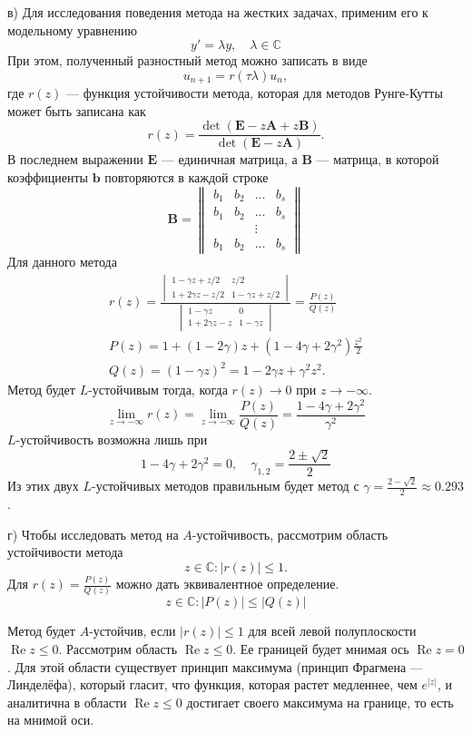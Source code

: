 \documentclass[12pt]{article}
\renewcommand{\vec}[1]{\boldsymbol{\mathbf{#1}}}
\begin{document}
в) Для исследования поведения метода на жестких задачах, применим его к модельному уравнению 
\[
y' = \lambda y,\quad\lambda \in \mathbb{C}
\]
При этом, полученный разностный метод можно записать в виде
\[
u_{n+1} = r(\tau \lambda) u_n,
\]
где $r(z)$ --- функция устойчивости метода, которая для методов Рунге-Кутты может быть записана как
\[
r(z) = \frac{\operatorname{det}(\vec E - z \vec A + z\vec B)}{\operatorname{det}(\vec E - z\vec A)}.
\]
В последнем выражении $\vec E$ --- единичная матрица, а $\vec B$ --- матрица, в которой коэффициенты $\vec b$ повторяются в каждой строке
\[
	\vec B = \begin{Vmatrix}
	b_1 & b_2 & \dots & b_s\\
	b_1 & b_2 & \dots & b_s\\
	&&\vdots\\
	b_1 & b_2 & \dots & b_s
	\end{Vmatrix}
\]
Для данного метода 
\begin{gather*}
r(z) = \frac{\begin{vmatrix}
	1 - \gamma z + z/2 & z/2\\
	1 + 2\gamma z - z/2 & 1 - \gamma z + z/2
	\end{vmatrix}}{\begin{vmatrix}
	1 - \gamma z & 0\\
	1 + 2\gamma z - z & 1 - \gamma z
	\end{vmatrix}}
	= \frac{P(z)}{Q(z)}\\
P(z) = 1 + (1 - 2\gamma) z + (1 - 4\gamma + 2\gamma^2)\frac{z^2}{2}\\
Q(z) = (1 - \gamma z)^2 = 1 - 2\gamma z + \gamma^2 z^2.
\end{gather*}
Метод будет $L$-устойчивым тогда, когда $r(z) \rightarrow 0$ при $z \rightarrow -\infty$.
\[
\lim_{z \rightarrow -\infty} r(z) = \lim_{z \rightarrow -\infty} \frac{P(z)}{Q(z)} = 
\frac{1 - 4 \gamma + 2 \gamma ^2}{\gamma^2}
\]
$L$-устойчивость возможна лишь при
\[
1 - 4\gamma + 2 \gamma^2 = 0, \quad \gamma_{1,2} = \frac{2 \pm \sqrt{2}}{2}
\]
Из этих двух $L$-устойчивых методов правильным будет метод с $\gamma = \frac{2 - \sqrt{2}}{2} \approx 0.293$.

г) Чтобы исследовать метод на $A$-устойчивость, рассмотрим область устойчивости метода
\[z \in \mathbb{C} : |r(z)| \leqslant 1.\]
Для $r(z) = \frac{P(z)}{Q(z)}$ можно дать эквивалентное определение.
\[z \in \mathbb{C} : |P(z)| \leqslant |Q(z)|\]

Метод будет $A$-устойчив, если $|r(z)| \leqslant 1$ для всей левой полуплоскости $\operatorname{Re} z \leqslant 0$. Рассмотрим область $\operatorname{Re} z \leqslant 0$. Ее границей будет мнимая ось $\operatorname{Re} z = 0$. Для этой области существует принцип максимума (принцип Фрагмена — Линделёфа), который гласит, что
функция, которая растет медленнее, чем $e^|z|$, и аналитична в области $\operatorname{Re} z \leqslant 0$ достигает своего максимума на границе, то есть на мнимой оси. 
\end{document}
